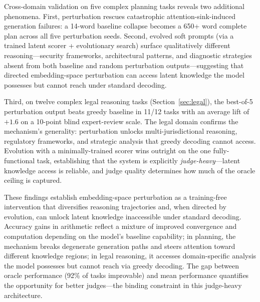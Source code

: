 \documentclass{article}
\begin{document}
Cross-domain validation on five complex planning tasks reveals two
additional phenomena. First, perturbation rescues catastrophic
attention-sink-induced generation failures: a 14-word baseline
collapse becomes a 650+ word complete plan across all five perturbation
seeds. Second, evolved soft prompts (via a trained latent scorer +
evolutionary search) surface qualitatively different reasoning---security
frameworks, architectural patterns, and diagnostic strategies absent
from both baseline and random perturbation outputs---suggesting that
directed embedding-space perturbation can access latent knowledge the
model possesses but cannot reach under standard decoding.

Third, on twelve complex legal reasoning tasks (Section~\ref{sec:legal}),
the best-of-5 perturbation output beats greedy baseline in 11/12
tasks with an average lift of $+1.6$ on a 10-point blind
expert-review scale. The legal domain confirms the mechanism's
generality: perturbation unlocks multi-jurisdictional reasoning,
regulatory frameworks, and strategic analysis that greedy decoding
cannot access. Evolution with a minimally-trained scorer wins outright
on the one fully-functional task, establishing that the system is
explicitly \emph{judge-heavy}---latent knowledge access is reliable,
and judge quality determines how much of the oracle ceiling is captured.

These findings establish embedding-space perturbation as a training-free
intervention that diversifies reasoning trajectories and, when directed
by evolution, can unlock latent knowledge inaccessible under standard
decoding. Accuracy gains in arithmetic reflect a mixture of improved
convergence and computation depending on the model's baseline capability;
in planning, the mechanism breaks degenerate generation paths and steers
attention toward different knowledge regions; in legal reasoning, it
accesses domain-specific analysis the model possesses but cannot reach
via greedy decoding. The gap between oracle performance (92\% of tasks
improvable) and mean performance quantifies the opportunity for better
judges---the binding constraint in this judge-heavy architecture.
\end{document}
